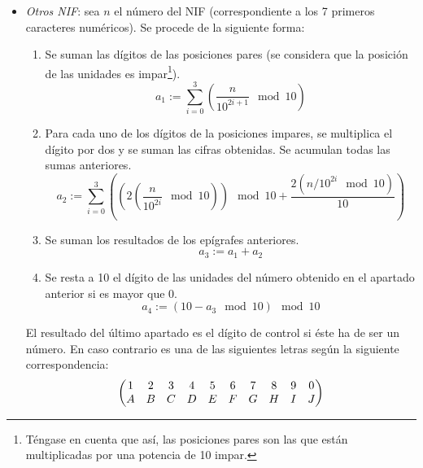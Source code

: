 \documentclass[11pt, a4paper, twoside]{report}
\begin{document}
\begin{itemize}
					\item {\itshape Otros NIF}: sea $n$ el número del NIF (correspondiente a los 7 primeros caracteres numéricos). Se procede de la siguiente forma:	
						\begin{enumerate}
							\item Se suman las dígitos de las posiciones pares (se considera que la posición de las unidades es impar\footnote{Téngase en cuenta que así, las posiciones pares son las que están multiplicadas por una potencia de 10 impar.}).
								\begin{equation*}
									a_1 := \sum_{i=0}^3 \left( \frac{n}{10^{2i + 1}} \mod 10 \right)
								\end{equation*}
							\item Para cada uno de los dígitos de la posiciones impares, se multiplica el dígito por dos y se suman las cifras obtenidas. Se acumulan todas las sumas anteriores.
								\begin{equation*}
									a_2 := \sum_{i=0}^3 \left( \left( 2 \left( \frac{n}{10^{2i}} \mod 10\right) \right) \mod 10 + \frac{ 2 \left( n / 10^{2i} \mod 10 \right)}{10} \right)
								\end{equation*}

							\item Se suman los resultados de los epígrafes anteriores.
								\begin{equation*}
									a_3 := a_1 + a_2
								\end{equation*}
							\item Se resta a 10 el dígito de las unidades del número obtenido en el apartado anterior si es mayor que 0.
								\begin{equation*}
									a_4 := (10 - a_3 \mod 10) \mod 10
								\end{equation*}
						\end{enumerate}

	
					El resultado del último apartado es el dígito de control si éste ha de ser un número. En caso contrario es una de las siguientes letras según la siguiente correspondencia:
						{\small
						\begin{equation*}
							\setcounter{MaxMatrixCols}{10}
							\begin{pmatrix}
								1 & 2 & 3 & 4 & 5 & 6 & 7 & 8 & 9 & 0 \\
								A & B & C & D & E & F & G & H & I & J
							\end{pmatrix}
						\end{equation*}
						}
				\end{itemize}
\end{document}
